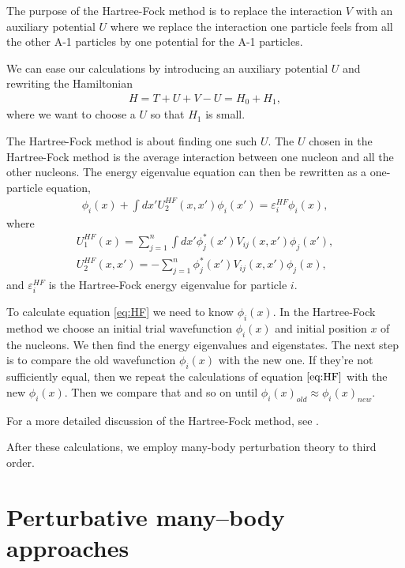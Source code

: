 The purpose of the Hartree-Fock method is to replace the interaction $V$ with
an auxiliary potential $U$ where we replace the interaction one particle feels
from all the other A-1 particles by one potential for the A-1 particles.

We can ease our calculations by introducing an auxiliary potential $U$ and
rewriting the Hamiltonian
\begin{align}
	H = T + U + V - U = H_0 + H_1,
\end{align}
where we want to choose a $U$ so that $H_1$ is small.

The Hartree-Fock method is about finding one such $U$. The $U$ chosen in the
Hartree-Fock method is the average interaction between one nucleon and all the
other nucleons. The energy eigenvalue equation can then be rewritten as a
one-particle equation,
\begin{align}
	[T(x) + U_1^{HF}(x)]\phi_i(x) + \int dx'U_2^{HF}(x,x')\phi_i(x') =
	\varepsilon_i^{HF}\phi_i(x),
	\label{eq:HF}
\end{align}
where
\begin{align}
U_1^{HF}(x) = \sum_{j=1}^n\int dx'\phi_j^*(x')V_{ij}(x,x')\phi_j(x'),\\
U_2^{HF}(x,x') = -\sum_{j=1}^n\phi_j^*(x')V_{ij}(x,x')\phi_j(x),
\end{align}
and $\varepsilon_i^{HF}$ is the Hartree-Fock energy eigenvalue for particle
$i$.

To calculate equation \ref{eq:HF} we need to know $\phi_i(x)$. In the
Hartree-Fock method we choose an initial trial wavefunction $\phi_i(x)$ and
initial position $x$ of the nucleons. We then find the energy eigenvalues and
eigenstates. The next step is to compare the old wavefunction $\phi_i(x)$ with
the new one. If they're not sufficiently equal, then we repeat the calculations
of equation $\ref{eq:HF}$ with the new $\phi_i(x)$. Then we compare that and so
on until $\phi_i(x)_{old} \approx \phi_i(x)_{new}$.

For a more detailed discussion of the Hartree-Fock method, see \citet{HF}.

After these calculations, we employ many-body perturbation theory to third
order. 


\section{Perturbative many--body approaches}

